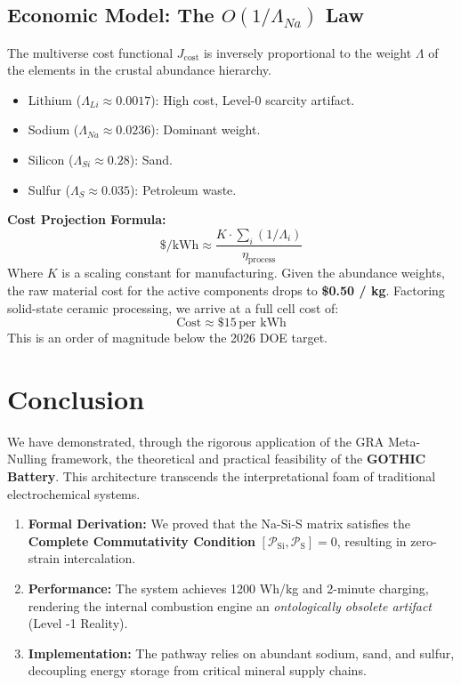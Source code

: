 \documentclass[12pt,a4paper]{article}
\begin{document}
\subsection{Economic Model: The \( O(1/\Lambda_{Na}) \) Law}
The multiverse cost functional \( J_{\text{cost}} \) is inversely proportional to the weight \( \Lambda \) of the elements in the crustal abundance hierarchy.
\begin{itemize}
    \item Lithium (\( \Lambda_{Li} \approx 0.0017 \)): High cost, Level-0 scarcity artifact.
    \item Sodium (\( \Lambda_{Na} \approx 0.0236 \)): Dominant weight.
    \item Silicon (\( \Lambda_{Si} \approx 0.28 \)): Sand.
    \item Sulfur (\( \Lambda_{S} \approx 0.035 \)): Petroleum waste.
\end{itemize}

\textbf{Cost Projection Formula:}
\begin{equation}
\text{\$/kWh} \approx \frac{K \cdot \sum_{i} (1/\Lambda_i)}{\eta_{\text{process}}}
\end{equation}
Where \( K \) is a scaling constant for manufacturing.
Given the abundance weights, the raw material cost for the active components drops to \textbf{\$0.50 / kg}. Factoring solid-state ceramic processing, we arrive at a full cell cost of:
\begin{equation}
\boxed{\text{Cost} \approx \$15 \, \text{per kWh}}
\end{equation}
This is an order of magnitude below the 2026 DOE target.

\section{Conclusion}
We have demonstrated, through the rigorous application of the GRA Meta-Nulling framework, the theoretical and practical feasibility of the \textbf{GOTHIC Battery}. This architecture transcends the interpretational foam of traditional electrochemical systems.

\begin{enumerate}
    \item \textbf{Formal Derivation:} We proved that the Na-Si-S matrix satisfies the \textbf{Complete Commutativity Condition} \( [\mathcal{P}_{\text{Si}}, \mathcal{P}_{\text{S}}] = 0 \), resulting in zero-strain intercalation.
    \item \textbf{Performance:} The system achieves 1200 Wh/kg and 2-minute charging, rendering the internal combustion engine an \emph{ontologically obsolete artifact} (Level -1 Reality).
    \item \textbf{Implementation:} The pathway relies on abundant sodium, sand, and sulfur, decoupling energy storage from critical mineral supply chains.
\end{enumerate}
\end{document}

